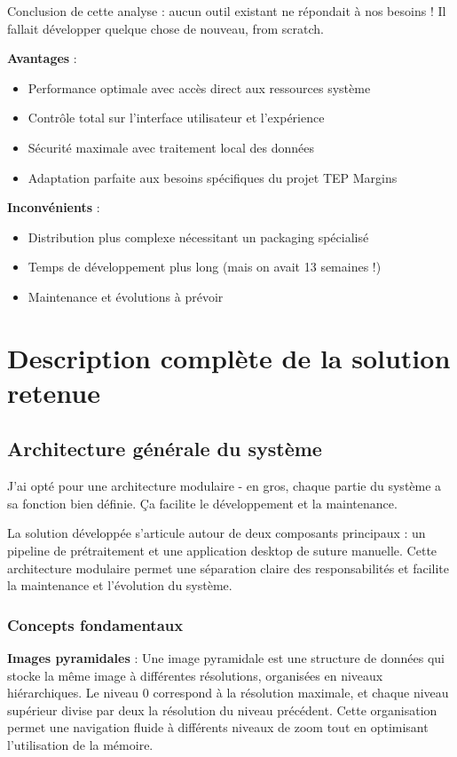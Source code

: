 \documentclass[11pt,a4paper]{report}
\begin{document}
Conclusion de cette analyse : aucun outil existant ne répondait à nos besoins ! Il fallait développer quelque chose de nouveau, from scratch.

\textbf{Avantages} :
\begin{itemize}
\item Performance optimale avec accès direct aux ressources système
\item Contrôle total sur l'interface utilisateur et l'expérience
\item Sécurité maximale avec traitement local des données
\item Adaptation parfaite aux besoins spécifiques du projet TEP Margins
\end{itemize}

\textbf{Inconvénients} :
\begin{itemize}
\item Distribution plus complexe nécessitant un packaging spécialisé
\item Temps de développement plus long (mais on avait 13 semaines !)
\item Maintenance et évolutions à prévoir
\end{itemize}

\section{Description complète de la solution retenue}

\subsection{Architecture générale du système}

J'ai opté pour une architecture modulaire - en gros, chaque partie du système a sa fonction bien définie. Ça facilite le développement et la maintenance.

La solution développée s'articule autour de deux composants principaux : un pipeline de prétraitement et une application desktop de suture manuelle. Cette architecture modulaire permet une séparation claire des responsabilités et facilite la maintenance et l'évolution du système.

\subsubsection{Concepts fondamentaux}

\textbf{Images pyramidales} : Une image pyramidale est une structure de données qui stocke la même image à différentes résolutions, organisées en niveaux hiérarchiques. Le niveau 0 correspond à la résolution maximale, et chaque niveau supérieur divise par deux la résolution du niveau précédent. Cette organisation permet une navigation fluide à différents niveaux de zoom tout en optimisant l'utilisation de la mémoire.
\end{document}
